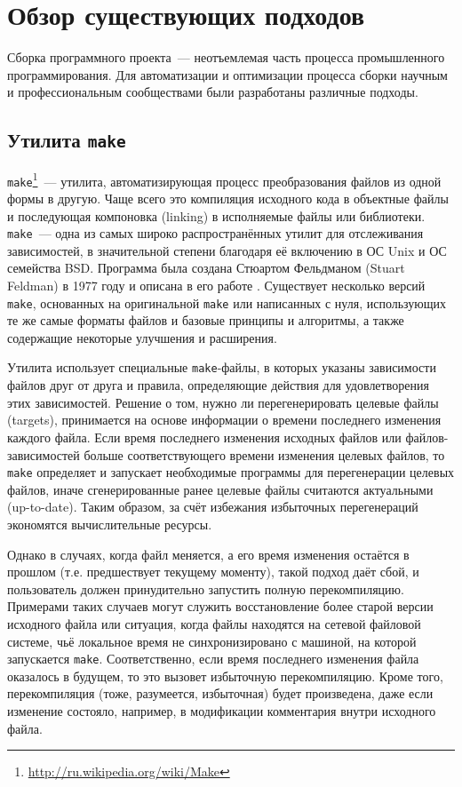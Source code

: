\section{Обзор существующих подходов}

Сборка программного проекта~--- неотъемлемая часть процесса промышленного программирования. Для автоматизации и оптимизации процесса сборки научным и профессиональным сообществами были разработаны различные подходы.

\subsection{Утилита \texttt{make}}
\texttt{make}\footnote{\url{http://ru.wikipedia.org/wiki/Make}}~--- утилита, автоматизирующая процесс преобразования файлов из одной формы в другую. Чаще всего это компиляция исходного кода в объектные файлы и последующая компоновка (linking) в исполняемые файлы или библиотеки. \texttt{make}~--- одна из самых широко распространённых утилит для отслеживания зависимостей, в значительной степени благодаря её включению в ОС Unix и ОС семейства BSD. Программа была создана Стюартом Фельдманом (Stuart Feldman) в 1977 году и описана в его работе \cite{feldman_make}. Существует несколько версий \texttt{make}, основанных на оригинальной \texttt{make} или написанных с нуля, использующих те же самые форматы файлов и базовые принципы и алгоритмы, а также содержащие некоторые улучшения и расширения.

Утилита использует специальные \texttt{make}-файлы, в которых указаны зависимости файлов друг от друга и правила, определяющие действия для удовлетворения этих зависимостей. Решение о том, нужно ли перегенерировать целевые файлы (targets), принимается на основе информации о времени последнего изменения каждого файла. Если время последнего изменения исходных файлов или файлов-зависимостей больше соответствующего времени изменения целевых файлов, то \texttt{make} определяет и запускает необходимые программы для перегенерации целевых файлов, иначе сгенерированные ранее целевые файлы считаются актуальными (up-to-date). Таким образом, за счёт избежания избыточных перегенераций экономятся вычислительные ресурсы.

Однако в случаях, когда файл меняется, а его время изменения остаётся в прошлом (т.е. предшествует текущему моменту), такой подход даёт сбой, и пользователь должен принудительно запустить полную перекомпиляцию. Примерами таких случаев могут служить восстановление более старой версии исходного файла или ситуация, когда файлы находятся на сетевой файловой системе, чьё локальное время не синхронизировано с машиной, на которой запускается \texttt{make}. Соответственно, если время последнего изменения файла оказалось в будущем, то это вызовет избыточную перекомпиляцию. Кроме того, перекомпиляция (тоже, разумеется, избыточная) будет произведена, даже если изменение состояло, например, в модификации комментария внутри исходного файла.


